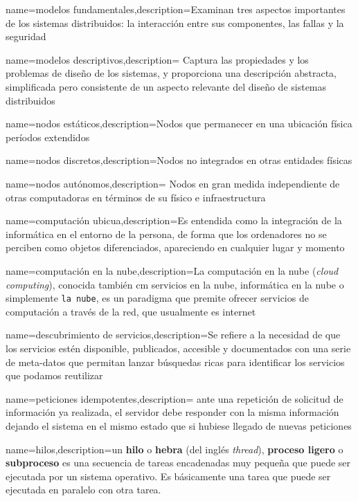 {name={modelos fundamentales},description={Examinan tres aspectos importantes de los sistemas distribuidos: la interacci\'on entre sus componentes, las fallas y la seguridad }}

{name={modelos descriptivos},description={ Captura las propiedades y los problemas de diseño de los sistemas, y proporciona  una descripción abstracta, simplificada pero consistente de un aspecto relevante del diseño de sistemas distribuidos }}

{name={nodos est\'aticos},description={Nodos que permanecer en una ubicación física períodos extendidos }}

{name={nodos discretos},description={Nodos no integrados en otras entidades físicas}} 

{name={nodos aut\'onomos},description={ Nodos en gran medida independiente de otras computadoras en términos de su físico e infraestructura }}


{name={computaci\'on ubicua},description={Es entendida como la integraci\'on de la inform\'atica en el entorno de la persona, de forma que los ordenadores no se perciben como objetos diferenciados, apareciendo en cualquier lugar y momento }}


{name={computaci\'on en la nube},description={La computaci\'on en la nube  (\textit{cloud computing}), conocida tambi\'en cm servicios en la nube, inform\'atica en la nube o simplemente \texttt{la nube}, es un paradigma que premite ofrecer servicios de computaci\'on a trav\'es de la red, que usualmente es internet}}

{name={descubrimiento de servicios},description={Se refiere a la necesidad  de que los servicios estén disponible, publicados, accesible y documentados  con una serie de meta-datos que permitan lanzar búsquedas ricas para identificar los servicios que podamos reutilizar }}	

{name={peticiones idempotentes},description={ ante una repetición de solicitud de información ya realizada, el servidor debe responder con la misma información dejando el sistema en el mismo estado que si hubiese llegado de nuevas peticiones}}

{name={hilos},description={un \textbf{hilo} o \textbf{hebra} (del inglés \textit{thread}), \textbf{proceso ligero} o \textbf{subproceso} es una secuencia de tareas encadenadas muy pequeña que puede ser ejecutada por un sistema operativo. Es básicamente una tarea que puede ser ejecutada en paralelo con otra tarea.}}

